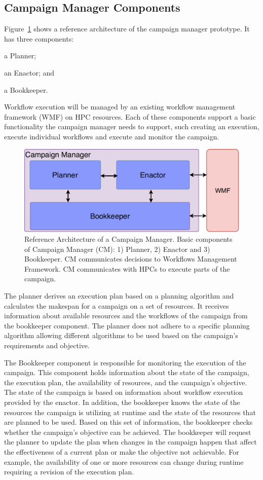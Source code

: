 \subsection{Campaign Manager Components}
\label{ssec:cm_arch}

Figure~\ref{fig:refarch} shows a reference architecture of the campaign manager prototype.
It has three components:
\begin{inparaenum}[(1)]
    \item a Planner;
    \item an Enactor; and
    \item a Bookkeeper. 
\end{inparaenum}
Workflow execution will be managed by an existing workflow management framework (WMF) on HPC resources.
Each of these components support a basic functionality the campaign manager needs to support, such creating an execution, execute individual workflows and execute and monitor the campaign.

\begin{figure}[t]
    \centering
    \includegraphics[width=.75\textwidth]{figures/manager/CEM_design.pdf}
    \caption{Reference Architecture of a Campaign Manager. Basic 
        components of Campaign Manager (CM): 1) Planner, 2) Enactor and 3) Bookkeeper. 
        CM communicates decisions to Workflows Management Framework. CM communicates with HPCs to 
        execute parts of the campaign.}\label{fig:refarch}
\end{figure}

The planner derives an execution plan based on a planning algorithm and calculates the makespan for a campaign on a set of resources.
It receives information about available resources and the workflows of the campaign from the bookkeeper component.
The planner does not adhere to a specific planning algorithm allowing different algorithms to be used based on the campaign's requirements and objective.

The Bookkeeper component is responsible for monitoring the execution of the campaign.
This component holds information about the state of the campaign, the execution plan, the availability of resources, and the campaign's objective.
The state of the campaign is based on information about workflow execution provided by the enactor.
In addition, the bookkeeper knows the state of the resources the campaign is utilizing at runtime and the state of the resources that are planned to be used.
Based on this set of information, the bookkeeper checks whether the campaign's objective can be achieved.
The bookkeeper will request the planner to update the plan when changes in the campaign happen that affect the effectiveness of a current plan or make the objective not achievable.
For example, the availability of one or more resources can change during runtime requiring a revision of the execution plan.

